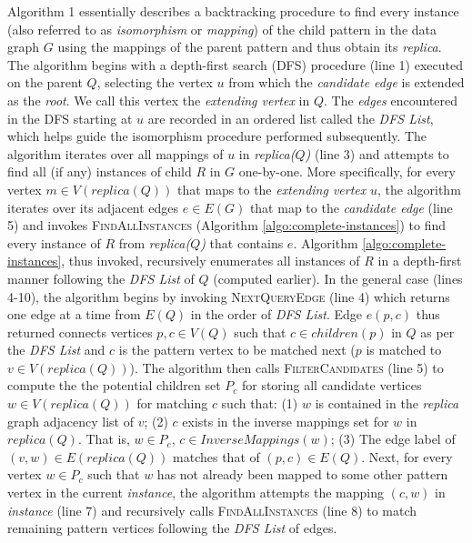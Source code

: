 Algorithm 1 essentially describes a backtracking procedure to find every instance (also referred to as
\emph{isomorphism} or \emph{mapping}) of the child pattern in the data graph $G$
using the mappings of the parent pattern and thus obtain its \emph{replica}. The
algorithm begins with a depth-first search ({\sf DFS}) procedure (line 1)
executed on the parent $Q$, selecting the vertex $u$ from which the
\emph{candidate edge} is extended as the \emph{root}. We call this vertex the
\textit{extending vertex} in $Q$. The \emph{edges} encountered in the {\sf DFS}
starting at $u$ are recorded in an ordered list called the \emph{DFS List},
which helps guide the isomorphism procedure performed subsequently. The
algorithm iterates over all mappings of $u$ in \emph{replica($Q$)} (line 3) and
attempts to find all (if any) instances of child $R$ in $G$ one-by-one. More
specifically, for every vertex $m \in V(replica(Q))$ that maps to the
\emph{extending vertex} $u$, the algorithm iterates over its adjacent edges $e
\in E(G)$ that map to the \emph{candidate edge} (line 5) and invokes
\textsc{FindAllInstances} (Algorithm \ref{algo:complete-instances}) to find
every instance of $R$ from \emph{replica($Q$)} that contains $e$. Algorithm
\ref{algo:complete-instances}, thus invoked, recursively enumerates all
instances of $R$ in a depth-first manner following the \emph{DFS List} of $Q$
(computed earlier). In the general case (lines 4-10), the algorithm begins by
invoking \textsc{NextQueryEdge} (line 4) which returns one edge at a time from
$E(Q)$ in the order of \emph{DFS List}. Edge $e(p,c)$ thus returned connects
vertices $p,c \in V(Q)$ such that $c\in children(p)$ in $Q$ as per the \emph{DFS
List} and $c$ is the pattern vertex to be matched next ($p$ is matched to $v \in
V(replica(Q))$). The algorithm then calls \textsc{FilterCandidates} (line 5) to
compute the the potential children set $P_c$ for storing all candidate vertices
$w\in V(replica(Q))$ for matching $c$ such that: (1) $w$ is contained in the
\textit{replica} graph adjacency list of $v$; (2) $c$ exists in the inverse
mappings set for $w$ in $replica(Q)$. That is, \forall $w \in P_{c}$, $c\in
InverseMappings(w)$; (3) The edge label of $(v,w)\in E(replica(Q))$ matches that
of $(p,c)\in E(Q)$. Next, for every vertex $w \in P_{c}$ such that $w$ has not
already been mapped to some other pattern vertex in the current
\textit{instance}, the algorithm attempts the mapping $(c,w)$ in
\textit{instance} (line 7) and recursively calls \textsc{FindAllInstances} (line
8) to match remaining pattern vertices following the \textit{DFS List} of edges.  

